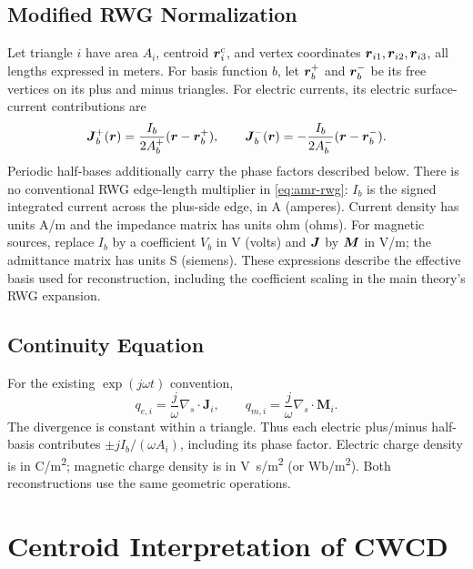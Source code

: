 \subsection{Modified RWG Normalization}
Let triangle $i$ have area $A_i$, centroid $\boldsymbol{r}^{\text{c}}_i$, and vertex coordinates
$\boldsymbol{r}_{i1},\boldsymbol{r}_{i2},\boldsymbol{r}_{i3}$, all lengths expressed in meters.
For basis function $b$, let $\boldsymbol{r}_b^+$ and $\boldsymbol{r}_b^-$ be its free
vertices on its plus and minus triangles. For electric currents,
its electric surface-current contributions are
\begin{equation}
  \boldsymbol{J}_b^+(\boldsymbol{r})  = \frac{I_b}{2A_b^+}(\boldsymbol{r} - \boldsymbol{r}_b^+),
  \qquad
 \boldsymbol{J}_b^-(\boldsymbol{r})  = -\frac{I_b}{2A_b^-}(\boldsymbol{r} - \boldsymbol{r}_b^-).
 \label{eq:amr-rwg}
\end{equation}
Periodic half-bases additionally carry the phase factors described below.
There is no conventional RWG edge-length multiplier in
\eqref{eq:amr-rwg}: $I_b$ is the signed integrated current across the plus-side
edge, in \unit{A} (amperes). Current density has units \unit{A/m} and the impedance matrix has
units \unit{ohm} (ohms). For magnetic sources, replace $I_b$ by a coefficient $V_b$ in \unit{V} (volts)
and $\boldsymbol{J}$ by $\boldsymbol{M}$ in \unit{V/m}; the admittance matrix has units \unit{S} (siemens).
These expressions describe the effective basis used for reconstruction, including
the coefficient scaling in the main theory's RWG expansion.

\subsection{Continuity Equation}
For the existing $\exp(j\omega t)$ convention,
\begin{equation}
  q_{e,i} = \frac{j}{\omega}\nabla_s \cdot \mathbf J_i,
  \qquad
  q_{m,i} = \frac{j}{\omega}\nabla_s\cdot\mathbf M_i.
  \label{eq:amr-charge}
\end{equation}
The divergence is constant within a triangle. Thus each electric plus/minus
half-basis contributes $\pm j I_b/(\omega A_i)$, including its phase factor.
Electric charge density is in \unit{C/m^2}; magnetic charge density is in
\unit{V.s/m^2} (or \unit{Wb/m^2}). Both reconstructions use the same geometric
operations. 


\section{Centroid Interpretation of CWCD}
